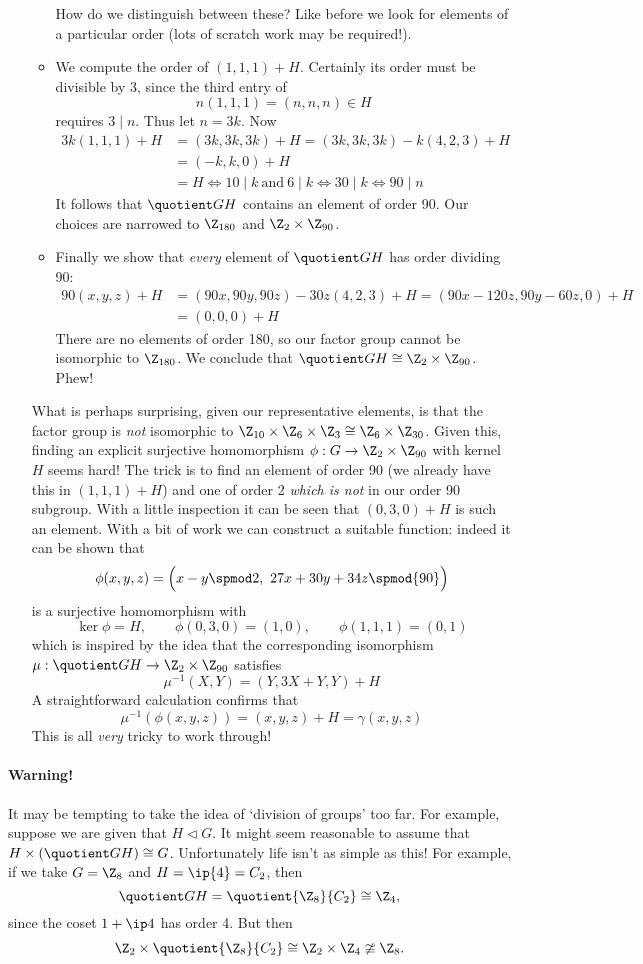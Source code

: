 \begin{enumerate}
\begin{itemize}
  How do we distinguish between these? Like before we look for elements of a particular order (lots of scratch work may be required!).
  \item We compute the order of $(1,1,1)+H$. Certainly its order must be divisible by 3, since the third entry of
  \[n(1,1,1)=(n,n,n)\in H\]
  requires $3\mid n$. Thus let $n=3k$. Now
  \begin{align*}
  3k(1,1,1)+H&=(3k,3k,3k)+H=(3k,3k,3k)-k(4,2,3)+H\tag*{(since $(4,2,3)\in H$)}\\
  &=(-k,k,0)+H\\
  &=H\iff 10\mid k\ \text{and}\ 6\mid k \iff 30\mid k\iff 90\mid n
  \end{align*}
  It follows that $\quotient GH$ contains an element of order 90. Our choices are narrowed to $\Z_{180}$ and $\Z_2\times\Z_{90}$.
  \item Finally we show that \emph{every} element of $\quotient GH$ has order dividing 90:
  \begin{align*}
  90(x,y,z)+H&=(90x,90y,90z)-30z(4,2,3)+H=(90x-120z,90y-60z,0)+H\\
  &=(0,0,0)+H
  \end{align*}
  There are no elements of order 180, so our factor group cannot be isomorphic to $\Z_{180}$. We conclude that $\quotient GH\cong\Z_2\times\Z_{90}$. Phew!
\end{itemize}
What is perhaps surprising, given our representative elements, is that the factor group is \emph{not} isomorphic to $\Z_{10}\times\Z_6\times\Z_3\cong \Z_6\times\Z_{30}$. Given this, finding an explicit surjective homomorphism $\phi:G\to\Z_2\times\Z_{90}$ with kernel $H$ seems hard! The trick is to find an element of order 90 (we already have this in $(1,1,1)+H$) and one of order 2 \emph{which is not} in our order 90 subgroup. With a little inspection it can be seen that $(0,3,0)+H$ is such an element. With a bit of work we can construct a suitable function: indeed it can be shown that
\[\phi(x,y,z)=\Bigl(x-y\spmod 2,\ 27x+30y+34z\spmod{90}\Bigr)\]
is a surjective homomorphism with
\[\ker\phi=H,\qquad \phi(0,3,0)=(1,0),\qquad \phi(1,1,1)=(0,1)\]
which is inspired by the idea that the corresponding isomorphism $\mu:\quotient GH\to\Z_2\times\Z_{90}$ satisfies
\[\mu^{-1}(X,Y)=(Y,3X+Y,Y)+H\]
A straightforward calculation confirms that
\[\mu^{-1}(\phi(x,y,z))=(x,y,z)+H=\gamma(x,y,z)\]
This is all \emph{very} tricky to work through!
\end{enumerate}

\paragraph{Warning!}
It may be tempting to take the idea of `division of groups' too far. For example, suppose we are given that $H\triangleleft G$. It might seem reasonable to assume that $H\times (\quotient GH)\cong G$. Unfortunately life isn't as simple as this! For example, if we take $G=\Z_8$ and $H=\ip{4}=C_2$, then
\[\quotient GH=\quotient{\Z_8}{C_2}\cong \Z_4,\]
since the coset $1+\ip 4$ has order 4. But then
\[\Z_2\times\quotient{\Z_8}{C_2}\cong\Z_2\times\Z_4\ncong\Z_8.\]
\newpage

